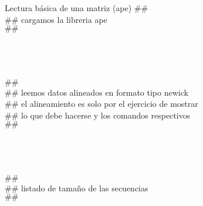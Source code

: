 
{Lectura b\'asica de una matriz (ape)}
$\#\#$
\\$\#\#$ cargamos la libreria ape
\\$\#\#$\\
\\
\\
\\
\\$\#\#$
\\$\#\#$ leemos datos alineados en formato tipo newick
\\$\#\#$ el alineamiento es solo por el ejercicio de mostrar
\\$\#\#$ lo que debe hacerse y los comandos respectivos
\\$\#\#$\\
\\
\\
\\
\\$\#\#$
\\$\#\#$ listado de tama\~no de las secuencias
\\$\#\#$ \\
\\

